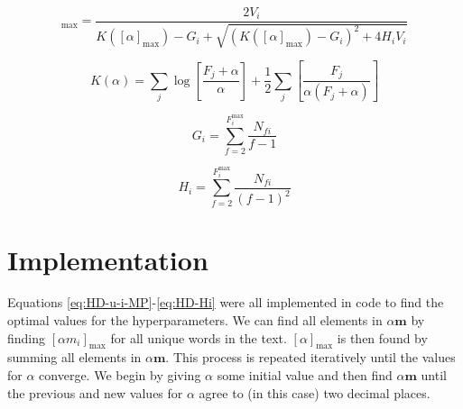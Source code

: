 {{{\begin{equation}
[\alpha m_{i}]_{\text{max}}=\frac{2V_{i}}{K([\alpha]_{\text{max}})-G_{i}+\sqrt{(K([\alpha]_{\text{max}})-G_{i})^{2}+4H_{i}V_{i}}}
\label{eq:HD-u-i-MP}
\end{equation}

\begin{equation}
K(\alpha)=\sum_{j}\log\left[\frac{F_{j}+\alpha}{\alpha}\right]+\frac{1}{2}\sum_{j}\left[\frac{F_{j}}{\alpha(F_{j}+\alpha)}\right]
\label{eq:HD-K}
\end{equation}

\begin{equation}
G_{i}=\sum_{f=2}^{F_{i}^{\text{max}}}\frac{N_{fi}}{f-1}
\label{eq:HD-Gi}
\end{equation}

\begin{equation}
H_{i}=\sum_{f=2}^{F_{i}^{\text{max}}}\frac{N_{fi}}{(f-1)^{2}}
\label{eq:HD-Hi}
\end{equation}

}}\cite{mackay1995hierarchical}}

\section{Implementation}

Equations \ref{eq:HD-u-i-MP}-\ref{eq:HD-Hi} were all implemented in code to find the optimal values for the hyperparameters. We can find all elements in $\alpha\boldsymbol{m}$ by finding $[\alpha m_{i}]_{\text{max}}$ for all unique words in the text. $[\alpha]_{\text{max}}$ is then found by summing all elements in $\alpha\boldsymbol{m}$. This process is repeated iteratively until the values for $\alpha$ converge. We begin by giving $\alpha$ some initial value and then find $\alpha\boldsymbol{m}$ until the previous and new values for $\alpha$ agree to (in this case) two decimal places.


